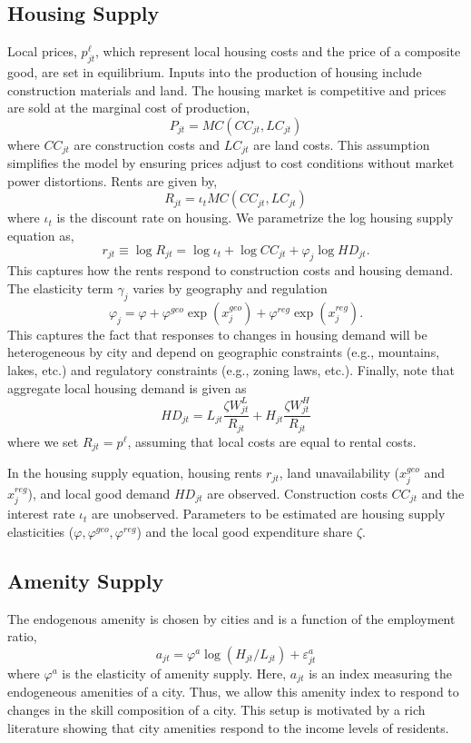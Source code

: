 \documentclass{article}
\begin{document}
\subsection{Housing Supply}
Local prices, $p^\ell_{jt}$, which represent local housing costs and the price of a composite good, are set in equilibrium. Inputs into the production of housing include construction materials and land. The housing market is competitive and prices are sold at the marginal cost of production,
$$P_{jt} = MC(CC_{jt}, LC_{jt})$$
where $CC_{jt}$ are construction costs and $LC_{jt}$ are land costs. This assumption simplifies the model by ensuring prices adjust to cost conditions without market power distortions. Rents are given by,
$$R_{jt} = \iota_t MC(CC_{jt},LC_{jt})$$
where $\iota_t$ is the discount rate on housing. We parametrize the log housing supply equation as,
\begin{equation}
    r_{jt} \equiv \log R_{jt} = \log \iota_t + \log CC_{jt} + \varphi_j \log HD_{jt}.
\end{equation}
This captures how the rents respond to construction costs and housing demand. The elasticity term $\gamma_j$ varies by geography and regulation
$$\varphi_j = \varphi + \varphi^{geo}\exp(x_j^{geo}) + \varphi^{reg} \exp(x_j^{reg}).$$
This captures the fact that responses to changes in housing demand will be heterogeneous by city and depend on geographic constraints (e.g., mountains, lakes, etc.) and regulatory constraints (e.g., zoning laws, etc.). 
Finally, note that aggregate local housing demand is given as
$$HD_{jt} = L_{jt} \frac{\zeta W_{jt}^L}{R_{jt}} + H_{jt} \frac{\zeta W_{jt}^H}{R_{jt}}$$
where we set $R_{jt} = p^\ell$, assuming that local costs are equal to rental costs.

In the housing supply equation, housing rents $r_{jt}$, land unavailability ($x^{geo}_j$ and $x^{reg}_j$), and local good demand $HD_{jt}$ are observed. Construction costs $CC_{jt}$ and the interest rate $\iota_t$ are unobserved. Parameters to be estimated are housing supply elasticities ($\varphi, \varphi^{geo}, \varphi^{reg}$) and the local good expenditure share $\zeta$.   

\subsection{Amenity Supply}
The endogenous amenity is chosen by cities and is a function of the employment ratio,
$$a_{jt} = \varphi^a \log(H_{jt}/L_{jt}) + \varepsilon^a_{jt}$$
where $\varphi^a$ is the elasticity of amenity supply. Here, $a_{jt}$ is an index measuring the endogeneous amenities of a city. Thus, we allow this amenity index to respond to changes in the skill composition of a city. This setup is motivated by a rich literature showing that city amenities respond to the income levels of residents. 
\end{document}
